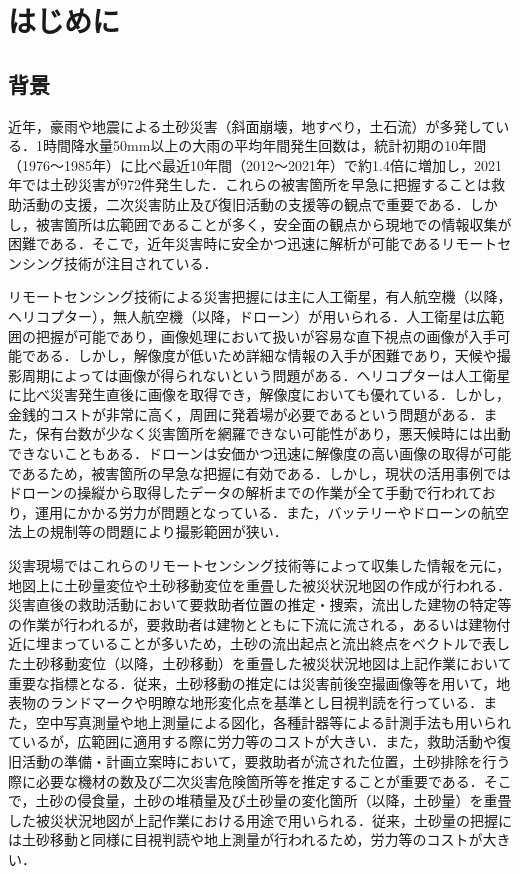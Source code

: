 \chapter{はじめに}
  \section{背景}
    近年，豪雨や地震による土砂災害（斜面崩壊，地すべり，土石流）が多発している．1時間降水量50mm以上の大雨の平均年間発生回数は，統計初期の10年間（1976〜1985年）に比べ最近10年間（2012〜2021年）で約1.4倍に増加し，2021年では土砂災害が972件発生した\cite{背景1, 背景2}．これらの被害箇所を早急に把握することは救助活動の支援，二次災害防止及び復旧活動の支援等の観点で重要である．しかし，被害箇所は広範囲であることが多く，安全面の観点から現地での情報収集が困難である\cite{背景3}．そこで，近年災害時に安全かつ迅速に解析が可能であるリモートセンシング技術が注目されている\cite{背景4}．

    リモートセンシング技術による災害把握には主に人工衛星，有人航空機（以降，ヘリコプター），無人航空機（以降，ドローン）が用いられる．人工衛星は広範囲の把握が可能であり，画像処理において扱いが容易な直下視点の画像が入手可能である．しかし，解像度が低いため詳細な情報の入手が困難であり，天候や撮影周期によっては画像が得られないという問題がある．ヘリコプターは人工衛星に比べ災害発生直後に画像を取得でき，解像度においても優れている．しかし，金銭的コストが非常に高く，周囲に発着場が必要であるという問題がある．また，保有台数が少なく災害箇所を網羅できない可能性があり，悪天候時には出動できないこともある．ドローンは安価かつ迅速に解像度の高い画像の取得が可能であるため，被害箇所の早急な把握に有効である．しかし，現状の活用事例ではドローンの操縦から取得したデータの解析までの作業が全て手動で行われており，運用にかかる労力が問題となっている．また，バッテリーやドローンの航空法上の規制等の問題により撮影範囲が狭い\cite{背景5, 背景6, 背景7}．

    災害現場ではこれらのリモートセンシング技術等によって収集した情報を元に，地図上に土砂量変位や土砂移動変位を重畳した被災状況地図の作成が行われる．災害直後の救助活動において要救助者位置の推定・捜索，流出した建物の特定等の作業が行われるが，要救助者は建物とともに下流に流される，あるいは建物付近に埋まっていることが多いため，土砂の流出起点と流出終点をベクトルで表した土砂移動変位（以降，土砂移動）を重畳した被災状況地図は上記作業において重要な指標となる．従来，土砂移動の推定には災害前後空撮画像等を用いて，地表物のランドマークや明瞭な地形変化点を基準とし目視判読を行っている．また，空中写真測量や地上測量による図化，各種計器等による計測手法も用いられているが，広範囲に適用する際に労力等のコストが大きい\cite{土砂移動解析背景1, 土砂移動解析背景2}．また，救助活動や復旧活動の準備・計画立案時において，要救助者が流された位置，土砂排除を行う際に必要な機材の数及び二次災害危険箇所等を推定することが重要である．そこで，土砂の侵食量，土砂の堆積量及び土砂量の変化箇所（以降，土砂量）を重畳した被災状況地図が上記作業における用途で用いられる．従来，土砂量の把握には土砂移動と同様に目視判読や地上測量が行われるため，労力等のコストが大きい\cite{土砂量解析背景1, 土砂量解析背景2}．



